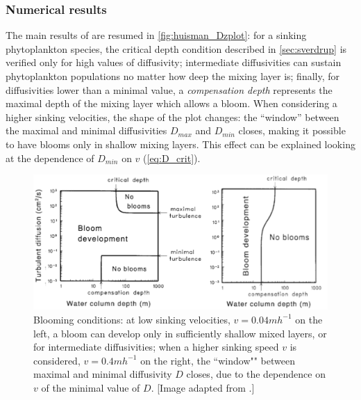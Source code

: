 \subsubsection{Numerical results}
The main results of \autocite{Huisman2002HowPersist} are resumed in \autoref{fig:huisman_Dzplot}: for a sinking phytoplankton species, the critical depth condition described in \autoref{sec:sverdrup} is verified only for high values of diffusivity; intermediate diffusivities can sustain phytoplankton populations no matter how deep the mixing layer is; finally, for diffusivities lower than a minimal value, a \textit{compensation depth} represents the maximal depth of the mixing layer which allows a bloom. When considering a higher sinking velocities, the shape of the plot changes: the ``window'' between the maximal and minimal diffusivities $D_{max}$ and $D_{min}$ closes, making it possible to have blooms only in shallow mixing layers. This effect can be explained looking at the dependence of $D_{min}$ on $v$ (\autoref{eq:D_crit}).
\begin{figure} [ht]
\centering
    \includegraphics[width=\textwidth]{img/references/huisman2002.png}
    \caption{Blooming conditions: at low sinking velocities, $v=0.04mh^{-1}$ on the left, a bloom can develop only in sufficiently shallow mixed layers, or for intermediate diffusivities; when a higher sinking speed $v$ is considered, $v=0.4mh^{-1}$ on the right, the ``window"" between maximal and minimal diffusivity $D$ closes, due to the dependence on $v$ of the minimal value of $D$. [Image adapted from \autocite{Huisman2002HowPersist}.]}
    \label{fig:huisman_Dzplot}
\end{figure}



